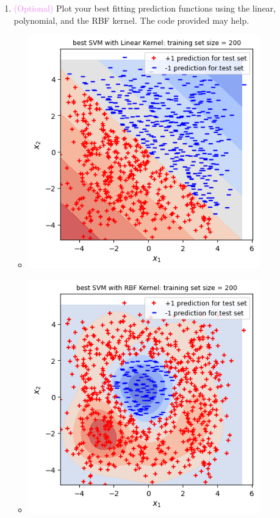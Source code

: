 \documentclass{article}
\theoremstyle{plain}
\theoremstyle{definition}
\begin{document}
\begin{enumerate}
\item \textcolor{violet}{(Optional)} Plot your best fitting prediction functions using the
linear, polynomial, and the RBF kernel. The code provided may help.
\begin{itemize}
    \color{blue}
    \item \includegraphics[width=10cm]{homework/homework_3/immages/question_35_1.png}
    \item \includegraphics[width=10cm]{homework/homework_3/immages/question_35_2.png}

\end{itemize}
\end{enumerate}
\end{document}
